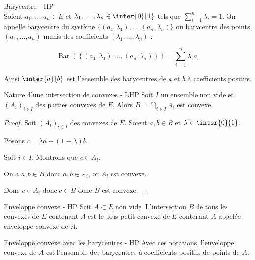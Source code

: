 
\begin{definition}{Barycentre - HP}{}
    \\Soient $a_1, \dots, a_n \in E$ et $\lambda_1, \dots, \lambda_n \in \inter{0}{1}$
    tels que $\sum_{i = 1}^n \lambda_i = 1$.
    On appelle barycentre du système $\{(a_1, \lambda_1), \dots, (a_n, \lambda_n)\}$
    ou barycentre des points $(a_1, \dots, a_n)$ munis des coefficients $(\lambda_1, \dots, \lambda_n)$ :

    \[\operatorname{Bar}(\left\{(a_1, \lambda_1), \dots, (a_n, \lambda_n)\right\}) = \sum_{i = 1}^n \lambda_i a_i\]

    Ainsi $\inter{a}{b}$ est l'ensemble des barycentres de $a$ et $b$ à coefficients positifs. 
\end{definition}

\begin{proposition}{Nature d'une intersection de convexes - LHP}{}
    Soit $I$ un ensemble non vide et $(A_i)_{i \in I}$ des parties convexes de $E$. 
    Alors $\displaystyle B = \bigcap_{i \in I} A_i$ est convexe.
\end{proposition}


\begin{proof}
    Soit $(A_i)_{i \in I}$ des convexes de $E$. 
    Soient $a, b \in B$ et $\lambda \in \inter{0}{1}$.
     
    Posons $c = \lambda a + (1 - \lambda)b$. 

    Soit $i \in I$. Montrons que $c \in A_i$. 

    On a $a, b \in B$ donc $a, b \in A_i$, or $A_i$ est convexe. 

    Donc $c \in A_i$ donc $c \in B$ donc $B$ est convexe. 
\end{proof}

\begin{definition}{Enveloppe convexe - HP}{}
    Soit $A \subset E$ non vide. L'intersection $B$ de tous les convexes de $E$ contenant $A$ est le plus petit convexe
    de $E$ contenant $A$ appelée enveloppe convexe de $A$.
\end{definition}

\begin{theoreme}{Enveloppe convexe avec les barycentres - HP}{}
    Avec ces notations, l'enveloppe convexe de $A$ est l'ensemble des barycentres à
    coefficients positifs de points de $A$. 
\end{theoreme}

